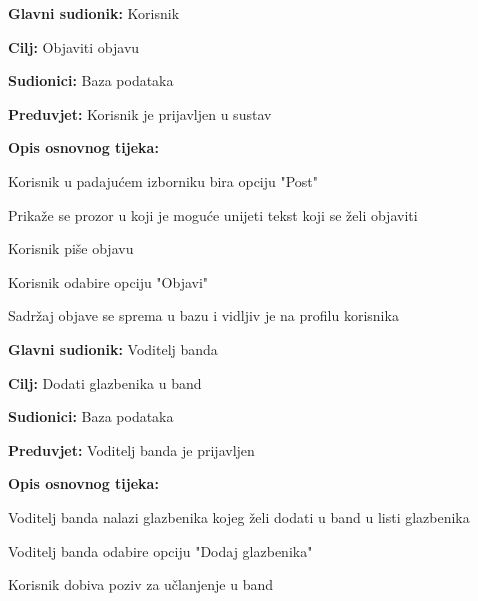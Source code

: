 	\noindent {}
	\begin{packed_item}
		
		\item \textbf{Glavni sudionik: } Korisnik
		\item  \textbf{Cilj:} Objaviti objavu
		\item  \textbf{Sudionici:} Baza podataka
		\item  \textbf{Preduvjet:} Korisnik je prijavljen u sustav
		\item  \textbf{Opis osnovnog tijeka:}
		
		\item[] \begin{packed_enum}
			
			\item Korisnik u padajućem izborniku bira opciju "Post"
			\item Prikaže se prozor u koji je moguće unijeti tekst koji se želi objaviti 
			\item Korisnik piše objavu
			\item Korisnik odabire opciju "Objavi"
			\item Sadržaj objave se sprema u bazu i vidljiv je na profilu korisnika
		\end{packed_enum}
	\end{packed_item}

	\noindent \underbar{\textbf{UC22 - Poziv u band}}
	\begin{packed_item}
		
		\item \textbf{Glavni sudionik: } Voditelj banda
		\item  \textbf{Cilj:} Dodati glazbenika u band
		\item  \textbf{Sudionici:} Baza podataka
		\item  \textbf{Preduvjet:} Voditelj banda je prijavljen 
		\item  \textbf{Opis osnovnog tijeka:} 
		
		\item[] \begin{packed_enum}
			\item Voditelj banda nalazi glazbenika kojeg želi dodati u band u listi glazbenika
			\item Voditelj banda odabire opciju "Dodaj glazbenika" 
			\item Korisnik dobiva poziv za učlanjenje u band
		\end{packed_enum}
		
	\end{packed_item}	

